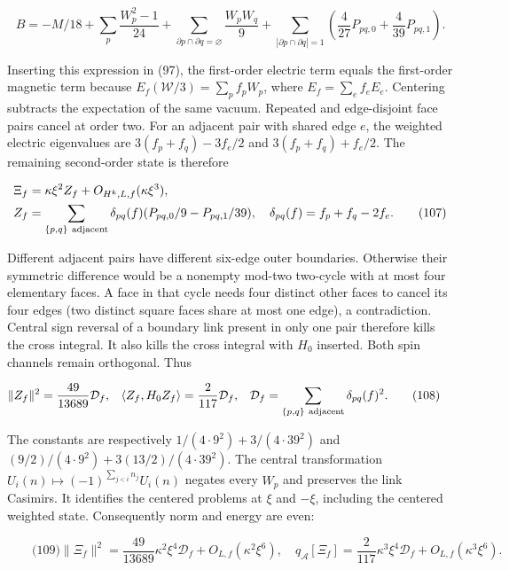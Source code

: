 \[
B=-M/18+\sum_p\frac{W_p^2-1}{24}
  +\sum_{\partial p\cap\partial q=\varnothing}\frac{W_pW_q}{9}
  +\sum_{|\partial p\cap\partial q|=1}
       \left(\frac4{27}P_{pq,0}+\frac4{39}P_{pq,1}\right).
\]

Inserting this expression in (97), the first-order electric term equals
the first-order magnetic term because
\(E_f(\mathcal W/3)=\sum_pf_pW_p\), where \(E_f=\sum_ef_eE_e\).
Centering subtracts the expectation of the same vacuum. Repeated and
edge-disjoint face pairs cancel at order two. For an adjacent pair with
shared edge \(e\), the weighted electric eigenvalues are
\(3(f_p+f_q)-3f_e/2\) and \(3(f_p+f_q)+f_e/2\). The remaining
second-order state is therefore

\[
\begin{aligned}
 \Xi_f&=\kappa\xi^2 Z_f+O_{H^k,L,f}(\kappa\xi^3),\\
 Z_f&=\sum_{\{p,q\}\ {\rm adjacent}}\delta_{pq}(f)
         (P_{pq,0}/9-P_{pq,1}/39),\quad
 \delta_{pq}(f)=f_p+f_q-2f_e. \qquad\text{(107)}
\end{aligned}
\]

Different adjacent pairs have different six-edge outer boundaries.
Otherwise their symmetric difference would be a nonempty mod-two
two-cycle with at most four elementary faces. A face in that cycle needs
four distinct other faces to cancel its four edges (two distinct square
faces share at most one edge), a contradiction. Central sign reversal of
a boundary link present in only one pair therefore kills the cross
integral. It also kills the cross integral with \(H_0\) inserted. Both
spin channels remain orthogonal. Thus

\[
\begin{aligned}
 \|Z_f\|^2&=\frac{49}{13689}\mathcal D_f,&
 \langle Z_f,H_0Z_f\rangle&=\frac2{117}\mathcal D_f,&
 \mathcal D_f&=\sum_{\{p,q\}\ {\rm adjacent}}\delta_{pq}(f)^2 .
 \qquad\text{(108)}
\end{aligned}
\]

The constants are respectively \(1/(4\cdot9^2)+3/(4\cdot39^2)\) and
\((9/2)/(4\cdot9^2)+3(13/2)/(4\cdot39^2)\). The central transformation
\(U_i(n)\mapsto(-1)^{\sum_{j<i}n_j}U_i(n)\) negates every \(W_p\) and
preserves the link Casimirs. It identifies the centered problems at
\(\xi\) and \(-\xi\), including the centered weighted state.
Consequently norm and energy are even:

\[
\qquad\text{(109)}
 \|\Xi_f\|^2=\frac{49}{13689}\kappa^2\xi^4\mathcal D_f+
 O_{L,f}(\kappa^2\xi^6),\quad
 q_{\mathcal A}[\Xi_f]=\frac2{117}\kappa^3\xi^4\mathcal D_f+
 O_{L,f}(\kappa^3\xi^6).
\]

